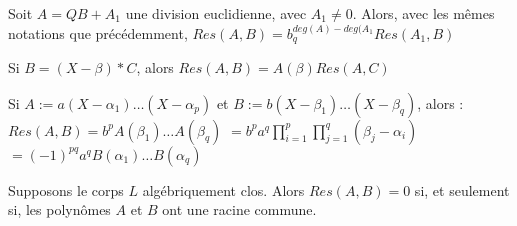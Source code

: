 \begin{prop}
Soit $A=QB+A_1$ une division euclidienne, avec $A_1 \neq 0$. Alors, avec les m\^emes notations que pr\'ec\'edemment, $Res(A,B)=b_q^{deg(A)-deg(A_1} Res(A_1,B)$
\end{prop}
\begin{Lemme}
Si $B=(X-\beta)*C$, alors $Res(A,B)=A(\beta)Res(A,C)$
\end{Lemme}
\begin{Thm}
Si $A:=a(X-\alpha_1)\ldots (X-\alpha_p)$ et $B:=b(X-\beta_1)\ldots(X-\beta_q)$, alors :
$Res(A,B)=b^pA(\beta_1)\ldots A(\beta_q)$
$=b^pa^q \prod_{i=1}^p \prod_{j=1}^q (\beta_j-\alpha_i)$
$=(-1)^{pq} a^q B(\alpha_1) \ldots B(\alpha_q)$
\end{Thm}
\begin{cor}
Supposons le corps $L$ alg\'ebriquement clos. Alors $Res(A,B)=0$ si, et seulement si, les polyn\^omes $A$ et $B$ ont une racine commune.
\end{cor}

